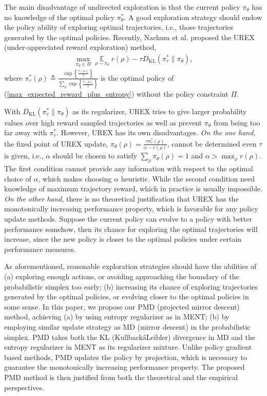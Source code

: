 \documentclass{article}
\DeclareMathOperator*\ep{\mathbb{E}}
\newcommand{\KL}{D_{\text{KL}}}
\begin{document}
The main disadvantage of undirected exploration is that the current policy $\pi_\theta$ has no knowledge of the optimal policy $\pi_\theta^*$. A good exploration strategy should endow the policy ability of exploring optimal trajectories, i.e., those trajectories generated by the optimal policies. Recently, Nachum et al. \cite{nachum2017improving} proposed the UREX (under-appreciated reward exploration) method,
\begin{equation}
\label{urex_objective}
\begin{split}
	\max\limits_{\pi_\theta \in \Pi}{ \ep\limits_{\rho \sim \pi_\theta}{  r(\rho)  - \tau \KL(\pi_\tau^* \| \pi_\theta) } },
\end{split}
\end{equation}
where $\pi_\tau^*(\rho) \triangleq \frac{\exp\left\{ \frac{r(\rho)}{\tau} \right\}}{ \sum\limits_{\rho}{ \exp\left\{ \frac{r(\rho)}{\tau} \right\} } }$ is the optimal policy of (\ref{max_expected_reward_plus_entropy}) without the policy constraint $\Pi$.

With $\KL(\pi_\tau^* \| \pi_\theta)$ as its regularizer, UREX tries to give larger probability values over high reward sampled trajectories as well as prevent $\pi_\theta$ from being too far away with $\pi_\tau^*$. However, UREX has its own disadvantages. \textit{On the one hand}, the fixed point of UREX update, $\pi_\theta(\rho) = \frac{\tau \pi_\tau^*(\rho)}{\alpha - r(\rho)}$, cannot be determined even $\tau$ is given, i.e., $\alpha$ should be chosen to satisfy $\sum_{\rho}{ \pi_\theta(\rho)} = 1$ and $\alpha > \max_{\rho}{ r(\rho) }$. The first condition cannot provide any information with respect to the optimal choice of $\alpha$, which makes choosing $\alpha$ heuristic. While the second condition need knowledge of maximum trajectory reward, which in practice is usually impossible. \textit{On the other hand}, there is no theoretical justification that UREX has the monotonically increasing performance property, which is favorable for any policy update methods. Suppose the current policy can evolve to a policy with better performance somehow, then its chance for exploring the optimal trajectories will increase, since the new policy is closer to the optimal policies under certain performance measures.

As aforementioned, reasonable exploration strategies should have the abilities of (a) exploring enough actions, or avoiding approaching the boundary of the probabilistic simplex too early; (b) increasing its chance of exploring trajectories generated by the optimal policies, or evolving closer to the optimal policies in some sense. In this paper, we propose our PMD (projected mirror descent) method, achieving (a) by using entropy regularizer as in MENT; (b) by employing similar update strategy as MD (mirror descent) in the probabilistic simplex. PMD takes both the KL (KullbackâLeibler) divergence in MD and the entropy regularizer in MENT as its regularizer mixture. Unlike policy gradient based methods, PMD updates the policy by projection, which is necessary to guarantee the monotonically increasing performance property. The proposed PMD method is then justified from both the theoretical and the empirical perspectives.
\end{document}
